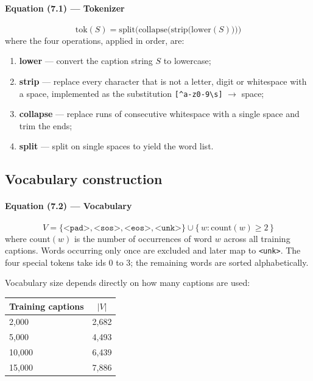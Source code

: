 \documentclass[12pt]{article}
\newcommand{\code}[1]{\texttt{#1}}
\begin{document}
\paragraph{Equation (7.1) --- Tokenizer}
\begin{equation}
\mathrm{tok}(S) = \mathrm{split}\bigl(\mathrm{collapse}\bigl(\mathrm{strip}\bigl(\mathrm{lower}(S)\bigr)\bigr)\bigr)
\end{equation}
where the four operations, applied in order, are:
\begin{enumerate}[nosep]
\item \textbf{lower} --- convert the caption string $S$ to lowercase;
\item \textbf{strip} --- replace every character that is not a letter, digit or whitespace with a space, implemented as the substitution \code{[\^{}a-z0-9\textbackslash s]} $\to$ space;
\item \textbf{collapse} --- replace runs of consecutive whitespace with a single space and trim the ends;
\item \textbf{split} --- split on single spaces to yield the word list.
\end{enumerate}

\subsection{Vocabulary construction}

\paragraph{Equation (7.2) --- Vocabulary}
\begin{equation}
V = \{\texttt{<pad>}, \texttt{<sos>}, \texttt{<eos>}, \texttt{<unk>}\} \cup \{\, w : \mathrm{count}(w) \ge 2 \,\}
\end{equation}
where $\mathrm{count}(w)$ is the number of occurrences of word $w$ across all training captions. Words occurring only once are excluded and later map to \code{<unk>}. The four special tokens take ids 0 to 3; the remaining words are sorted alphabetically.

Vocabulary size depends directly on how many captions are used:

\begin{center}
\begin{tabular}{@{}lc@{}}
\toprule
Training captions & $|V|$ \\
\midrule
2,000  & 2,682 \\
5,000  & 4,493 \\
10,000 & 6,439 \\
15,000 & 7,886 \\
\bottomrule
\end{tabular}
\end{center}
\end{document}
